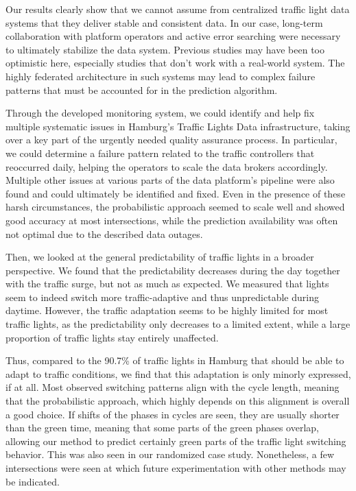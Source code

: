 \begin{Summary}
Our results clearly show that we cannot assume from centralized traffic light data systems that they deliver stable and consistent data. In our case, long-term collaboration with platform operators and active error searching were necessary to ultimately stabilize the data system. Previous studies may have been too optimistic here, especially studies that don’t work with a real-world system. The highly federated architecture in such systems may lead to complex failure patterns that must be accounted for in the prediction algorithm. 

Through the developed monitoring system, we could identify and help fix multiple systematic issues in Hamburg’s Traffic Lights Data infrastructure, taking over a key part of the urgently needed quality assurance process. In particular, we could determine a failure pattern related to the traffic controllers that reoccurred daily, helping the operators to scale the data brokers accordingly. Multiple other issues at various parts of the data platform's pipeline were also found and could ultimately be identified and fixed. Even in the presence of these harsh circumstances, the probabilistic approach seemed to scale well and showed good accuracy at most intersections, while the prediction availability was often not optimal due to the described data outages.

Then, we looked at the general predictability of traffic lights in a broader perspective. We found that the predictability decreases during the day together with the traffic surge, but not as much as expected. We measured that lights seem to indeed switch more traffic-adaptive and thus unpredictable during daytime. However, the traffic adaptation seems to be highly limited for most traffic lights, as the predictability only decreases to a limited extent, while a large proportion of traffic lights stay entirely unaffected. 

Thus, compared to the 90.7\% of traffic lights in Hamburg that should be able to adapt to traffic conditions, we find that this adaptation is only minorly expressed, if at all. Most observed switching patterns align with the cycle length, meaning that the probabilistic approach, which highly depends on this alignment is overall a good choice. If shifts of the phases in cycles are seen, they are usually shorter than the green time, meaning that some parts of the green phases overlap, allowing our method to predict certainly green parts of the traffic light switching behavior. This was also seen in our randomized case study. Nonetheless, a few intersections were seen at which future experimentation with other methods may be indicated.
\end{Summary}

